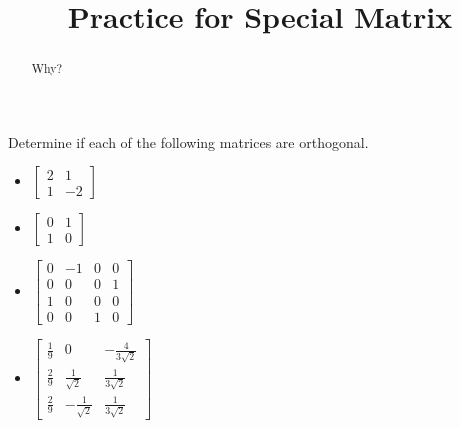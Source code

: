 \documentclass{ximera}
\title{Practice for Special Matrix}
\begin{document}
\begin{abstract}
Why?
\end{abstract}
\maketitle




\begin{exercise}%
    Determine if each of the following matrices are orthogonal.
    \begin{itemize}
        \item $\displaystyle \begin{bmatrix}2 & 1 \\ 1 & -2 \end{bmatrix}$ 
        \item $\displaystyle \begin{bmatrix}0 & 1 \\ 1 & 0 \end{bmatrix}$ 
        \item $\displaystyle \begin{bmatrix} 0 & -1 & 0 & 0 \\ 0& 0 & 0 & 1 \\ 1 & 0 & 0 & 0 \\ 0 & 0 & 1 & 0 \end{bmatrix}$ 
        \item $\displaystyle \begin{bmatrix} \frac{1}{9} & 0 & -\frac{4}{3\sqrt{2}} \\ \frac{2}{9} & \frac{1}{\sqrt{2}} & \frac{1}{3\sqrt{2}} \\ \frac{2}{9} & -\frac{1}{\sqrt{2}} & \frac{1}{3\sqrt{2}}  \end{bmatrix}$ 
    \end{itemize}
\end{exercise}
\end{document}
